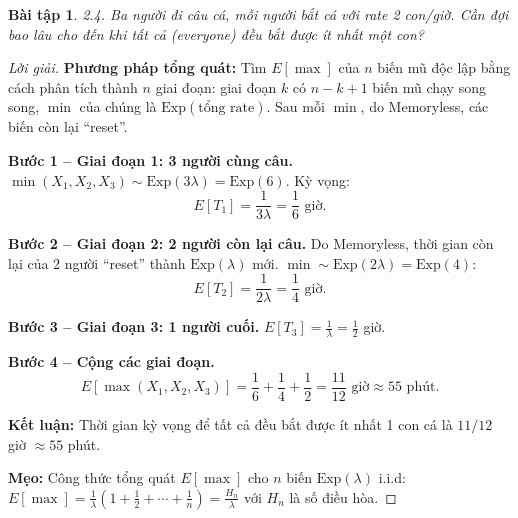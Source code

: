 \documentclass[8pt,a4paper]{article}
\newtheorem{exercise}{Bài tập}
\newenvironment{solution}{\begin{proof}[Lời giải]}{\end{proof}}
\begin{document}
\begin{exercise}
2.4. Ba người đi câu cá, mỗi người bắt cá với rate 2 con/giờ. Cần đợi bao lâu cho đến khi tất cả (everyone) đều bắt được ít nhất một con?
\end{exercise}
\begin{solution}
\textbf{Phương pháp tổng quát:} Tìm $E[\max]$ của $n$ biến mũ độc lập bằng cách phân tích thành $n$ giai đoạn: giai đoạn $k$ có $n-k+1$ biến mũ chạy song song, $\min$ của chúng là $\text{Exp}(\text{tổng rate})$. Sau mỗi $\min$, do Memoryless, các biến còn lại ``reset''.

\textbf{Bước 1 -- Giai đoạn 1: 3 người cùng câu.} $\min(X_1, X_2, X_3) \sim \text{Exp}(3\lambda) = \text{Exp}(6)$. Kỳ vọng:
\[
  E[T_1] = \frac{1}{3\lambda} = \frac{1}{6} \text{ giờ}.
\]

\textbf{Bước 2 -- Giai đoạn 2: 2 người còn lại câu.} Do Memoryless, thời gian còn lại của 2 người ``reset'' thành $\text{Exp}(\lambda)$ mới. $\min \sim \text{Exp}(2\lambda) = \text{Exp}(4)$:
\[
  E[T_2] = \frac{1}{2\lambda} = \frac{1}{4} \text{ giờ}.
\]

\textbf{Bước 3 -- Giai đoạn 3: 1 người cuối.} $E[T_3] = \frac{1}{\lambda} = \frac{1}{2}$ giờ.

\textbf{Bước 4 -- Cộng các giai đoạn.}
\[
  E[\max(X_1, X_2, X_3)] = \frac{1}{6} + \frac{1}{4} + \frac{1}{2} = \boxed{\frac{11}{12} \text{ giờ} \approx 55 \text{ phút}}.
\]

\textbf{Kết luận:} Thời gian kỳ vọng để tất cả đều bắt được ít nhất 1 con cá là $11/12$ giờ $\approx 55$ phút.

\textbf{Mẹo:} Công thức tổng quát $E[\max]$ cho $n$ biến $\text{Exp}(\lambda)$ i.i.d: $E[\max] = \frac{1}{\lambda}\left(1 + \frac{1}{2} + \cdots + \frac{1}{n}\right) = \frac{H_n}{\lambda}$ với $H_n$ là số điều hòa.
\end{solution}
\end{document}
